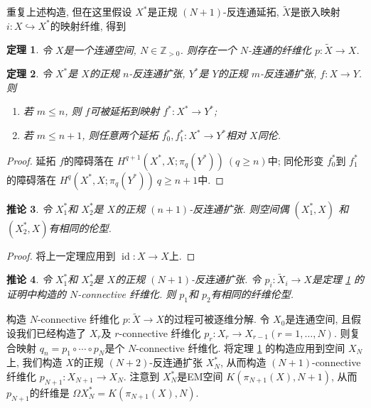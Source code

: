 \documentclass{ctexart}
\theoremstyle{plain}
\newtheorem{theorem}{定理}[section]
\newtheorem{corollary}[theorem]{推论}
\theoremstyle{definition}
\begin{document}
        重复上述构造, 但在这里假设 $X^{*}$是正规 $(N+1)$-反连通延拓, $\tilde{X}$是嵌入映射 $i:X\hookrightarrow X^{*}$的映射纤维, 得到 
        
        \begin{theorem}
            \label{thm:existence of n connective fibration}
            令 $X$是一个连通空间, $N\in \mathbb{Z}_{>0}$. 则存在一个 $N$-连通的纤维化 $p:\tilde{X}\to X$.
        \end{theorem}

        \begin{theorem}
            \label{thm:extension properties of anticonnected extension}
            令 $X^{*}$是 $X$的正规 $n$-反连通扩张, $Y^{*}$是 $Y$的正规 $m$-反连通扩张, $f:X\to Y$. 则 
            \begin{enumerate}
                \item 若 $m\le n$, 则 $f$可被延拓到映射 $f^{*}:X^{*}\to Y^{*}$;
                \item 若 $m\le n+1$, 则任意两个延拓 $f_0^{*},f_1^{*}:X^{*}\to Y^{*}$相对 $X$同伦.
            \end{enumerate}
        \end{theorem}

        \begin{proof}
            延拓 $f$的障碍落在 $H^{q+1}(X^{*},X;\pi_{q}(Y^{*}))\ (q\ge n)$中; 同伦形变 $f_0^{*}$到 $f_1^{*}$的障碍落在 $H^{q}(X^{*},X;\pi_{q}(Y^{*}))\ q\ge n+1$中.
        \end{proof}

        \begin{corollary}
            令 $X_1^{*}$和 $X_2^{*}$是 $X$的正规 $(n+1)$-反连通扩张. 则空间偶 $(X_1^{*},X)$ 和 $(X_2^{*},X)$有相同的伦型.
        \end{corollary}

        \begin{proof}
            将上一定理应用到 $\operatorname{id}:X\to X$上.
        \end{proof}

        \begin{corollary}
            令 $X_1^{*}$和 $X_2^{*}$是 $X$的正规 $(N+1)$-反连通扩张. 令 $p_{i}:\tilde{X}_{i}\to X$是定理 \ref{thm:existence of n connective fibration} 的证明中构造的 $N$-connective 纤维化. 则 $p_1$和 $p_2$有相同的纤维伦型.
        \end{corollary}

        构造 $N$-connective 纤维化 $p:\tilde{X}\to X$的过程可被逐维分解. 令 $X_0$是连通空间, 且假设我们已经构造了 $X_{r}$及 $r$-connective 纤维化 $p_{r}:X_{r}\to X_{r-1}(r=1, \ldots ,N)$. 则复合映射 $q_{n}=p_1\circ \cdots\circ p_{N}$是个 $N$-connective 纤维化. 将定理 \ref{thm:existence of n connective fibration} 的构造应用到空间 $X_{N}$上, 我们构造 $X$的正规 $(N+2)$-反连通扩张 $X_{N}^{*}$, 从而构造 $(N+1)$-connective 纤维化 $p_{N+1}:X_{N+1}\to X_{N}$. 注意到 $X_{N}^{*}$是EM空间 $K(\pi_{N+1}(X),N+1)$, 从而 $p_{N+1}$的纤维是 $\Omega X_{N}^{*}=K(\pi_{N+1}(X),N)$.
\end{document}
